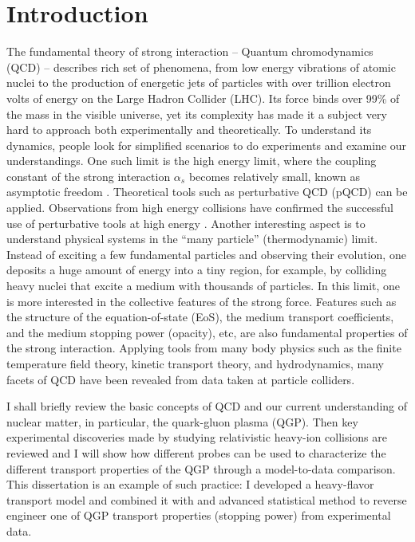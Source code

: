 \chapter{Introduction}
\label{chapter:introduction}
The fundamental theory of strong interaction -- Quantum chromodynamics (QCD) -- describes rich set of phenomena, from low energy vibrations of atomic nuclei to the production of energetic jets of particles with over trillion electron volts of energy on the Large Hadron Collider (LHC).
Its force binds over 99\% of the mass in the visible universe, yet its complexity has made it a subject very hard to approach both experimentally and theoretically.
To understand its dynamics, people look for simplified scenarios to do experiments and examine our understandings.
One such limit is the high energy limit, where the coupling constant of the strong interaction $\alpha_s$ becomes relatively small, known as asymptotic freedom \cite{Gross:1973id,Politzer:1973fx}. 
Theoretical tools such as perturbative QCD (pQCD) can be applied.
Observations from high energy collisions have confirmed the successful use of perturbative tools at high energy \cite{RevModPhys.59.465}.
Another interesting aspect is to understand physical systems in the ``many particle'' (thermodynamic) limit.
Instead of exciting a few fundamental particles and observing their evolution, one deposits a huge amount of energy into a tiny region, for example, by colliding heavy nuclei that excite a medium with thousands of particles. 
In this limit, one is more interested in the collective features of the strong force.
Features such as the structure of the equation-of-state (EoS), the medium transport coefficients, and the medium stopping power (opacity), etc, are also fundamental properties of the strong interaction.
Applying tools from many body physics such as the finite temperature field theory, kinetic transport theory, and hydrodynamics, many facets of QCD have been revealed from data taken at particle colliders.

I shall briefly review the basic concepts of QCD and our current understanding of nuclear matter, in particular, the quark-gluon plasma (QGP). 
Then key experimental discoveries made by studying relativistic heavy-ion collisions are reviewed and I will show how different probes can be used to characterize the different transport properties of the QGP through a model-to-data comparison.
This dissertation is an example of such practice: I developed a heavy-flavor transport model and combined it with and advanced statistical method to reverse engineer one of QGP transport properties (stopping power) from experimental data.

